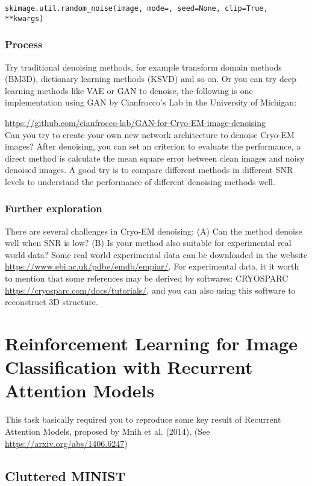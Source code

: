 \documentclass[11pt]{article}
\begin{document}
\texttt{skimage.util.random\_noise(image, mode=, seed=None, clip=True, **kwargs)}

\subsubsection{Process}
Try traditional denoising methods, for example transform domain methods (BM3D), dictionary learning methods (KSVD) and so on. 
Or you can try deep learning methods like VAE or GAN to denoise, the following is one implementation using GAN by Cianfrocco's Lab in the University of Michigan:

\url{https://github.com/cianfrocco-lab/GAN-for-Cryo-EM-image-denoising}\\

\noindent Can you try to create your own new network architecture to denoise Cryo-EM images? After denoising, you can set an criterion to evaluate the performance, a direct method is calculate the mean square error between clean images and noisy denoised images. A good try is to compare different methods in different SNR levels to understand the performance of different denoising methods well.

\subsubsection{Further exploration}
There are several challenges in Cryo-EM denoising: (A) Can the method denoise well when SNR is low? (B) Is your method also suitable for experimental real world data? Some real world experimental data can be downloaded in the website \url{https://www.ebi.ac.uk/pdbe/emdb/empiar/}. For experimental data, it it worth to mention that some references may be derived by softwares: CRYOSPARC \url{https://cryosparc.com/docs/tutorials/}, and you can also using this software to reconstruct 3D structure.


\section{Reinforcement Learning for Image Classification with Recurrent Attention Models} 

This task basically required you to reproduce some key result of Recurrent Attention Models, proposed by Mnih et al. (2014). (See \url{https://arxiv.org/abs/1406.6247})

\subsection{Cluttered MINIST}
\end{document}
